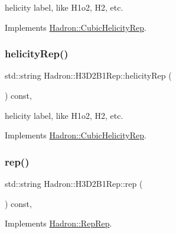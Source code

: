 helicity label, like H1o2, H2, etc. 

Implements \mbox{\hyperlink{structHadron_1_1CubicHelicityRep_af1096946b7470edf0a55451cc662f231}{Hadron\+::\+Cubic\+Helicity\+Rep}}.

\mbox{\label{structHadron_1_1H3D2B1Rep_a3264ff0e5357cfb2c346fa2c8f68cab5}} 
\subsubsection{\texorpdfstring{helicityRep()}{helicityRep()}\hspace{0.1cm}{\footnotesize\ttfamily [3/3]}}
{\footnotesize\ttfamily std\+::string Hadron\+::\+H3\+D2\+B1\+Rep\+::helicity\+Rep (\begin{DoxyParamCaption}{ }\end{DoxyParamCaption}) const\hspace{0.3cm}{\ttfamily [inline]}, {\ttfamily [virtual]}}

helicity label, like H1o2, H2, etc. 

Implements \mbox{\hyperlink{structHadron_1_1CubicHelicityRep_af1096946b7470edf0a55451cc662f231}{Hadron\+::\+Cubic\+Helicity\+Rep}}.

\mbox{\label{structHadron_1_1H3D2B1Rep_a43cf9c155f37ec6e0fa26166cd1a5f2a}} 
\subsubsection{\texorpdfstring{rep()}{rep()}\hspace{0.1cm}{\footnotesize\ttfamily [1/5]}}
{\footnotesize\ttfamily std\+::string Hadron\+::\+H3\+D2\+B1\+Rep\+::rep (\begin{DoxyParamCaption}{ }\end{DoxyParamCaption}) const\hspace{0.3cm}{\ttfamily [inline]}, {\ttfamily [virtual]}}



Implements \mbox{\hyperlink{structHadron_1_1RepRep_ab3213025f6de249f7095892109575fde}{Hadron\+::\+Rep\+Rep}}.

\mbox{\label{structHadron_1_1H3D2B1Rep_a43cf9c155f37ec6e0fa26166cd1a5f2a}} 
